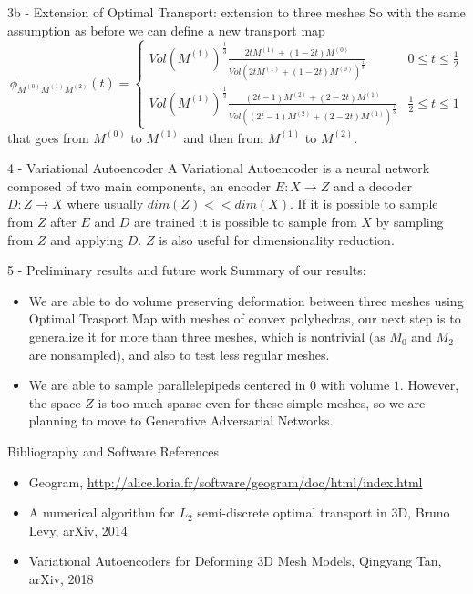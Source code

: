 \documentclass[b0paper,portrait]{baposter}
\begin{document}
\begin{poster}
\begin{posterbox}[name=otm3,below=otm2,span=6,column=0]{3b
    - Extension of Optimal Transport: extension to three meshes }
So with the same assumption as before we can define a new transport map $$\phi_{M^{(0)}M^{(1)}M^{(2)}}(t)=\begin{cases}
Vol(M^{(1)})^{\frac{1}{3}}\frac{2tM^{(1)}+(1-2t)M^{(0)}}{Vol(2tM^{(1)}+(1-2t)M^{(0)})^{\frac{1}{3}}} & 0 \le t \le \frac{1}{2} \\
Vol(M^{(1)})^{\frac{1}{3}}\frac{(2t-1)M^{(2)}+(2-2t)M^{(1)}}{Vol((2t-1)M^{(2)}+(2-2t)M^{(1)})^{\frac{1}{3}}} & \frac{1}{2} \le t \le 1
\end{cases}$$
that goes from $M^{(0)}$ to $M^{(1)}$ and then from $M^{(1)}$ to $M^{(2)}$.  
\end{posterbox}

\begin{posterbox}[name=vae,below=otm3,span=6,column=0]{4
    - Variational Autoencoder }
 A Variational Autoencoder is a neural network composed of two main components, an encoder $E:X\rightarrow Z$ and a decoder $D:Z\rightarrow X$ where usually $dim(Z)<<dim(X)$. If it is possible to sample from $Z$ after $E$ and $D$ are trained it is possible to sample from $X$ by sampling from $Z$ and applying $D$. $Z$ is also useful for dimensionality reduction. 
\end{posterbox}
\begin{posterbox}[name=results,below=vae,span=6,column=0]{5
    - Preliminary results and future work}
Summary of our results:
\begin{itemize}
\item We are able to do volume preserving deformation between three meshes using Optimal Trasport Map with meshes of convex polyhedras, our next step is to generalize it for more than three meshes, which is nontrivial (as $M_{0}$ and $M_{2}$ are nonsampled), and also to test less regular meshes.
\item We are able to sample parallelepipeds centered in $0$ with volume $1$. However, the space $Z$ is too much sparse even for these simple meshes, so we are planning to move to Generative Adversarial Networks. 
\end{itemize}
\end{posterbox}
\begin{posterbox}[name=bibliography,below=results,span=6,column=0]{Bibliography and Software References}
\begin{itemize}
\item Geogram, \url{http://alice.loria.fr/software/geogram/doc/html/index.html}
\item A numerical algorithm for $L_{2}$ semi-discrete optimal transport in 3D, Bruno Levy, arXiv, 2014
\item Variational Autoencoders for Deforming 3D Mesh Models, Qingyang Tan, arXiv, 2018
\end{itemize}
\end{posterbox}

\end{poster}
\end{document}
